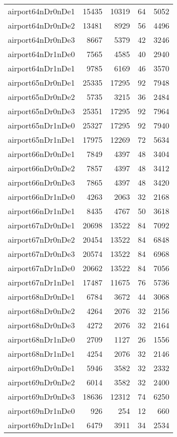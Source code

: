 \begin{longtable}{lrrrr}
airport64nDr0nDe1 & 15435 & 10319 & 64 & 5052 \\
airport64nDr0nDe2 & 13481 & 8929 & 56 & 4496 \\
airport64nDr0nDe3 & 8667 & 5379 & 42 & 3246 \\
airport64nDr1nDe0 & 7565 & 4585 & 40 & 2940 \\
airport64nDr1nDe1 & 9785 & 6169 & 46 & 3570 \\
airport65nDr0nDe1 & 25335 & 17295 & 92 & 7948 \\
airport65nDr0nDe2 & 5735 & 3215 & 36 & 2484 \\
airport65nDr0nDe3 & 25351 & 17295 & 92 & 7964 \\
airport65nDr1nDe0 & 25327 & 17295 & 92 & 7940 \\
airport65nDr1nDe1 & 17975 & 12269 & 72 & 5634 \\
airport66nDr0nDe1 & 7849 & 4397 & 48 & 3404 \\
airport66nDr0nDe2 & 7857 & 4397 & 48 & 3412 \\
airport66nDr0nDe3 & 7865 & 4397 & 48 & 3420 \\
airport66nDr1nDe0 & 4263 & 2063 & 32 & 2168 \\
airport66nDr1nDe1 & 8435 & 4767 & 50 & 3618 \\
airport67nDr0nDe1 & 20698 & 13522 & 84 & 7092 \\
airport67nDr0nDe2 & 20454 & 13522 & 84 & 6848 \\
airport67nDr0nDe3 & 20574 & 13522 & 84 & 6968 \\
airport67nDr1nDe0 & 20662 & 13522 & 84 & 7056 \\
airport67nDr1nDe1 & 17487 & 11675 & 76 & 5736 \\
airport68nDr0nDe1 & 6784 & 3672 & 44 & 3068 \\
airport68nDr0nDe2 & 4264 & 2076 & 32 & 2156 \\
airport68nDr0nDe3 & 4272 & 2076 & 32 & 2164 \\
airport68nDr1nDe0 & 2709 & 1127 & 26 & 1556 \\
airport68nDr1nDe1 & 4254 & 2076 & 32 & 2146 \\
airport69nDr0nDe1 & 5946 & 3582 & 32 & 2332 \\
airport69nDr0nDe2 & 6014 & 3582 & 32 & 2400 \\
airport69nDr0nDe3 & 18636 & 12312 & 74 & 6250 \\
airport69nDr1nDe0 & 926 & 254 & 12 & 660 \\
airport69nDr1nDe1 & 6479 & 3911 & 34 & 2534 \\

\end{longtable}
